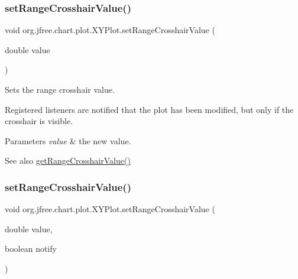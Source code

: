 \subsubsection{\texorpdfstring{set\+Range\+Crosshair\+Value()}{setRangeCrosshairValue()}\hspace{0.1cm}{\footnotesize\ttfamily [1/2]}}
{\footnotesize\ttfamily void org.\+jfree.\+chart.\+plot.\+X\+Y\+Plot.\+set\+Range\+Crosshair\+Value (\begin{DoxyParamCaption}\item[{double}]{value }\end{DoxyParamCaption})}

Sets the range crosshair value. 

Registered listeners are notified that the plot has been modified, but only if the crosshair is visible.


\begin{DoxyParams}{Parameters}
{\em value} & the new value.\\
\hline
\end{DoxyParams}
\begin{DoxySeeAlso}{See also}
\mbox{\hyperlink{classorg_1_1jfree_1_1chart_1_1plot_1_1_x_y_plot_a5ea3dd940ae92c3196aa77833a6c96d1}{get\+Range\+Crosshair\+Value()}} 
\end{DoxySeeAlso}
\mbox{\label{classorg_1_1jfree_1_1chart_1_1plot_1_1_x_y_plot_a8c01d8f1d54f631d76b28a6833302360}} 
\subsubsection{\texorpdfstring{set\+Range\+Crosshair\+Value()}{setRangeCrosshairValue()}\hspace{0.1cm}{\footnotesize\ttfamily [2/2]}}
{\footnotesize\ttfamily void org.\+jfree.\+chart.\+plot.\+X\+Y\+Plot.\+set\+Range\+Crosshair\+Value (\begin{DoxyParamCaption}\item[{double}]{value,  }\item[{boolean}]{notify }\end{DoxyParamCaption})}

